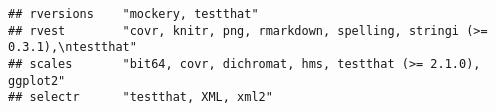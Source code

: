 \documentclass[]{book}
\begin{document}
\begin{verbatim}
## rversions    "mockery, testthat"                                                                                                                                                                                                                                                                                                                                                                                                                                                                                                                                                                                                                                                                                       
## rvest        "covr, knitr, png, rmarkdown, spelling, stringi (>= 0.3.1),\ntestthat"                                                                                                                                                                                                                                                                                                                                                                                                                                                                                                                                                                                                                                    
## scales       "bit64, covr, dichromat, hms, testthat (>= 2.1.0), ggplot2"                                                                                                                                                                                                                                                                                                                                                                                                                                                                                                                                                                                                                                               
## selectr      "testthat, XML, xml2"                                                                                                                                                                                                                                                                                                                                                                                                                                                                                                                                                                                                                                                                                     

\end{verbatim}
\end{document}
